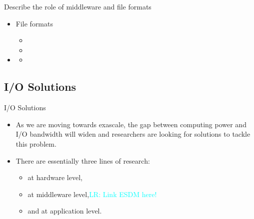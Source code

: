 \documentclass[compress,11pt,xcolor=svgnames,aspectratio=169]{beamer}
\newcommand{\lr}[1]{\textcolor{cyan}{LR: #1}}
\begin{document}
\begin{frame}[t]{Describe the role of middleware and file formats}

\begin{itemize}

  \item File formats
    \begin{itemize}
        \item
        \item
    \end{itemize}

  \item
    \begin{itemize}
      \item
    \end{itemize}

\end{itemize}

\end{frame}

\subsection{I/O Solutions}

\begin{frame}[t]{I/O Solutions}

\begin{itemize}

\item As we are moving towards exascale, the gap between computing power and I/O bandwidth will
widen and researchers are looking for solutions to tackle this problem.\\[0.4cm]

\item There are essentially three lines of research:\\[0.4cm]

    \begin{itemize}
    \setlength\itemsep{0.6cm}

      \item at hardware level,
      \item at middleware level,\lr{Link ESDM here!}
      \item and at application level.

    \end{itemize}

\end{itemize}

\nocite{3372390}

\end{frame}
\end{document}
